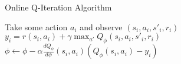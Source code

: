 \begin{algorithm}[t!]
\caption{Online Q-Iteration Algorithm}
\begin{algorithmic}[1]
\label{alg:onlineQiter}
    \STATE Take some action $a_i$ and observe $(s_i,a_i,s'_i,r_i)$
    \STATE $y_i = r(s_i,a_i) + \gamma \max_{a'}Q_\phi(s_i,a_i,s'_i,r_i)$
    \STATE $\phi \leftarrow \phi-\alpha\frac{dQ_\phi}{d\phi}(s_i,a_i)(Q_\phi(s_i,a_i) - y_i)$
\ENDWHILE
\end{algorithmic}
\end{algorithm}